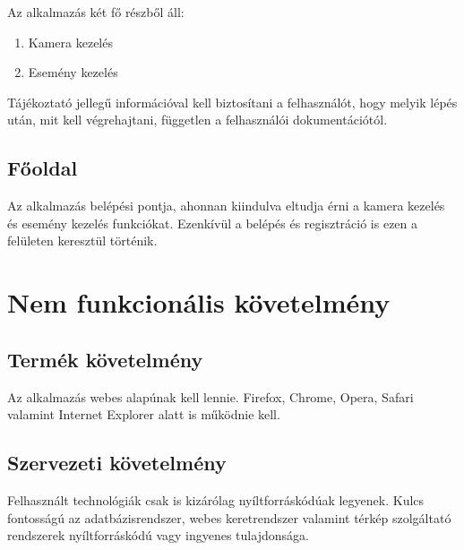   
  Az alkalmazás két fő részből áll:
  \begin{enumerate}
    \item Kamera kezelés
    \item Esemény kezelés
  \end{enumerate}
  Tájékoztató jellegű információval kell biztosítani a felhasználót, hogy melyik lépés után, mit kell végrehajtani, független a felhasználói dokumentációtól.

\subsection{Főoldal} %
\label{sub:főoldal}
  Az alkalmazás belépési pontja, ahonnan kiindulva eltudja érni a kamera kezelés és esemény kezelés funkciókat. Ezenkívül a belépés és regisztráció is ezen a felületen keresztül történik.

	

\section{Nem funkcionális követelmény}
\subsection{Termék követelmény} %
\label{sub:termék_követelmény}
Az alkalmazás webes alapúnak kell lennie. Firefox, Chrome, Opera, Safari valamint Internet Explorer alatt is működnie kell.

\subsection{Szervezeti követelmény} %
\label{sub:szervezeti_követelmény}
Felhasznált technológiák csak is kizárólag nyíltforráskódúak legyenek. Kulcs fontosságú az adatbázisrendszer, webes keretrendszer valamint térkép szolgáltató rendszerek nyíltforráskódú vagy ingyenes tulajdonsága.

